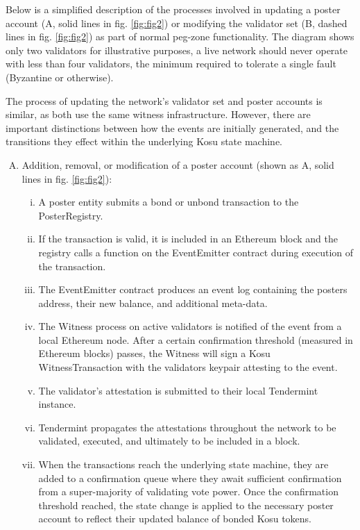 \documentclass[10pt]{article}
\begin{document}
Below is a simplified description of the processes involved in updating a poster account (A, solid lines in fig. \ref{fig:fig2}) or modifying the validator set (B, dashed lines in fig. \ref{fig:fig2}) as part of normal peg-zone functionality. The diagram shows only two validators for illustrative purposes, a live network should never operate with less than four validators, the minimum required to tolerate a single fault (Byzantine or otherwise).
\medskip

The process of updating the network’s validator set and poster accounts is similar, as both use the same witness infrastructure. However, there are important distinctions between how the events are initially generated, and the transitions they effect within the underlying Kosu state machine.

\begin{enumerate}[A.]
  \item Addition, removal, or modification of a poster account (shown as A, solid lines in fig. \ref{fig:fig2}):
  \begin{enumerate}[i.]
    \item A poster entity submits a bond or unbond transaction to the PosterRegistry.
    \item If the transaction is valid, it is included in an Ethereum block and the registry calls a function on the EventEmitter contract during execution of the transaction.
    \item The EventEmitter contract produces an event log containing the posters address, their new balance, and additional meta-data.
    \item The Witness process on active validators is notified of the event from a local Ethereum node. After a certain confirmation threshold (measured in Ethereum blocks) passes, the Witness will sign a Kosu WitnessTransaction with the validators keypair attesting to the event.
    \item The validator’s attestation is submitted to their local Tendermint instance.
    \item Tendermint propagates the attestations throughout the network to be validated, executed, and ultimately to be included in a block.
    \item When the transactions reach the underlying state machine, they are added to a confirmation queue where they await sufficient confirmation from a super-majority of validating vote power. Once the confirmation threshold reached, the state change is applied to the necessary poster account to reflect their updated balance of bonded Kosu tokens.

\end{enumerate}
\end{enumerate}
\end{document}
